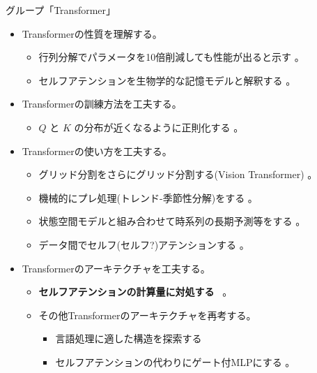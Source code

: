 \documentclass[b5paper,xelatex,ja=standard,10pt]{bxjsarticle}
\begin{document}
\vspace{1pt}
\begin{PROP}[left=0pt]{グループ「Transformer」}
\begin{itemize}
  \item Transformerの性質を理解する。
    \begin{itemize}
    \item 行列分解でパラメータを10倍削減しても性能が出ると示す \cite{AliakbarPanahi2021}。
    \item セルフアテンションを生物学的な記憶モデルと解釈する \cite{TrentonBricken2021}。
  \end{itemize}
  \vspace{6pt}
  \item Transformerの訓練方法を工夫する。
  \begin{itemize}
    \item $Q$ と $K$ の分布が近くなるように正則化する \cite{ShujianZhang2021}。
  \end{itemize}
  \vspace{6pt}
  \item Transformerの使い方を工夫する。
  \begin{itemize}
    \item グリッド分割をさらにグリッド分割する(Vision Transformer) \cite{KaiHan2021}。
    \item 機械的にプレ処理(トレンド-季節性分解)をする \cite{HaixuWu2021}。
    \item 状態空間モデルと組み合わせて時系列の長期予測等をする \cite{BinhTang2021}。
    \item データ間でセルフ(セルフ?)アテンションする \cite{JannikKossen2021}。
  \end{itemize}
  \vspace{6pt}
  \item Transformerのアーキテクチャを工夫する。
  \begin{itemize}
    \item \textbf{セルフアテンションの計算量に対処する} \cite{YifanChen2021} \cite{XuezheMa2021} \cite{SubhabrataDutta2021} \cite{SebastianJaszczur2021} \cite{BeidiChen2021} \cite{ChenZhu2021} \cite{HongyuRen2021} \, \cite{ShengjieLuo2021} \cite{TanNguyen2021}。
    \item その他Transformerのアーキテクチャを再考する。
    \begin{itemize}
      \item 言語処理に適した構造を探索する \cite{DavidSo2021}
      \item セルフアテンションの代わりにゲート付MLPにする \cite{HanxiaoLiu2021}。

\end{itemize}
\end{itemize}
\end{itemize}
\end{PROP}
\end{document}
